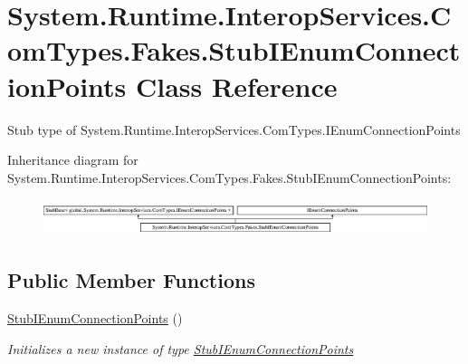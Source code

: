\hypertarget{class_system_1_1_runtime_1_1_interop_services_1_1_com_types_1_1_fakes_1_1_stub_i_enum_connection_points}{\section{System.\-Runtime.\-Interop\-Services.\-Com\-Types.\-Fakes.\-Stub\-I\-Enum\-Connection\-Points Class Reference}
\label{class_system_1_1_runtime_1_1_interop_services_1_1_com_types_1_1_fakes_1_1_stub_i_enum_connection_points}
}


Stub type of System.\-Runtime.\-Interop\-Services.\-Com\-Types.\-I\-Enum\-Connection\-Points 


Inheritance diagram for System.\-Runtime.\-Interop\-Services.\-Com\-Types.\-Fakes.\-Stub\-I\-Enum\-Connection\-Points\-:\begin{figure}[H]
\begin{center}
\leavevmode
\includegraphics[height=1.087379cm]{class_system_1_1_runtime_1_1_interop_services_1_1_com_types_1_1_fakes_1_1_stub_i_enum_connection_points}
\end{center}
\end{figure}
\subsection*{Public Member Functions}
\begin{DoxyCompactItemize}
\item 
\hyperlink{class_system_1_1_runtime_1_1_interop_services_1_1_com_types_1_1_fakes_1_1_stub_i_enum_connection_points_a408f91209551d5115f4efe0147798d7c}{Stub\-I\-Enum\-Connection\-Points} ()
\begin{DoxyCompactList}\small\item\em Initializes a new instance of type \hyperlink{class_system_1_1_runtime_1_1_interop_services_1_1_com_types_1_1_fakes_1_1_stub_i_enum_connection_points}{Stub\-I\-Enum\-Connection\-Points}\end{DoxyCompactList}\end{DoxyCompactItemize}
